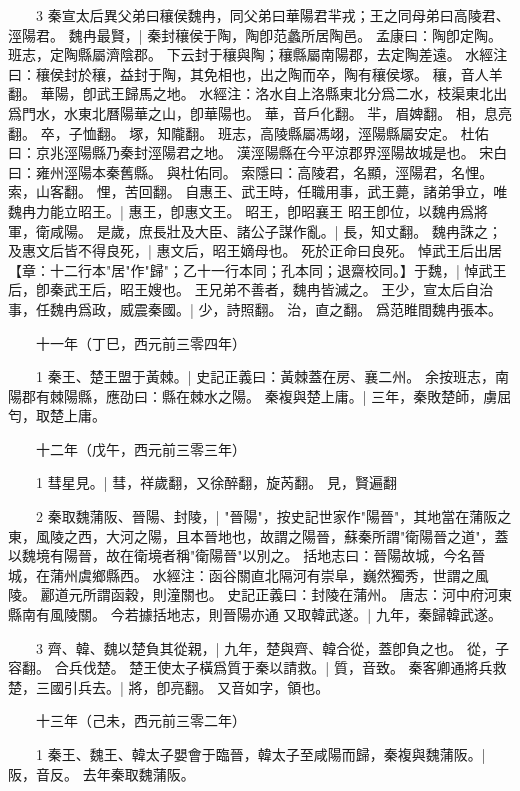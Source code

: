 　　3 秦宣太后異父弟曰穰侯魏冉，同父弟曰華陽君羋戎；王之同母弟曰高陵君、涇陽君。
	魏冉最賢，|{
	秦封穰侯于陶，陶卽范蠡所居陶邑。
	孟康曰：陶卽定陶。
	班志，定陶縣屬濟陰郡。
	下云封于穰與陶；穰縣屬南陽郡，去定陶差遠。
	水經注曰：穰侯封於穰，益封于陶，其免相也，出之陶而卒，陶有穰侯塚。
	穰，音人羊翻。
	華陽，卽武王歸馬之地。
	水經注：洛水自上洛縣東北分爲二水，枝渠東北出爲門水，水東北曆陽華之山，卽華陽也。
	華，音戶化翻。
	羋，眉婢翻。
	相，息亮翻。
	卒，子恤翻。
	塚，知隴翻。
	班志，高陵縣屬馮翊，涇陽縣屬安定。
	杜佑曰：京兆涇陽縣乃秦封涇陽君之地。
	漢涇陽縣在今平涼郡界涇陽故城是也。
	宋白曰：雍州涇陽本秦舊縣。
	與杜佑同。
	索隱曰：高陵君，名顯，涇陽君，名悝。
	索，山客翻。
	悝，苦回翻。
}
自惠王、武王時，任職用事，武王薨，諸弟爭立，唯魏冉力能立昭王。|{
	惠王，卽惠文王。
	昭王，卽昭襄王
	}
昭王卽位，以魏冉爲將軍，衛咸陽。
	是歲，庶長壯及大臣、諸公子謀作亂。|{
	長，知丈翻。
}
魏冉誅之；及惠文后皆不得良死，|{
	惠文后，昭王嫡母也。
	死於正命曰良死。
}
悼武王后出居【章：十二行本"居"作"歸"；乙十一行本同；孔本同；退齋校同。】于魏，|{
	悼武王后，卽秦武王后，昭王嫂也。
}
王兄弟不善者，魏冉皆滅之。
	王少，宣太后自治事，任魏冉爲政，威震秦國。|{
	少，詩照翻。
	治，直之翻。
	爲范睢間魏冉張本。
}

　　十一年（丁巳，西元前三零四年）

　　1 秦王、楚王盟于黃棘。|{
	史記正義曰：黃棘蓋在房、襄二州。
	余按班志，南陽郡有棘陽縣，應劭曰：縣在棘水之陽。
}
秦複與楚上庸。|{
	三年，秦敗楚師，虜屈匄，取楚上庸。
}

　　十二年（戊午，西元前三零三年）

　　1 彗星見。|{
	彗，祥歲翻，又徐醉翻，旋芮翻。
	見，賢遍翻
	}

　　2 秦取魏蒲阪、晉陽、封陵，|{
	"晉陽"，按史記世家作"陽晉"，其地當在蒲阪之東，風陵之西，大河之陽，且本晉地也，故謂之陽晉，蘇秦所謂"衛陽晉之道"，蓋以魏境有陽晉，故在衛境者稱"衛陽晉"以別之。
	括地志曰：晉陽故城，今名晉城，在蒲州虞鄉縣西。
	水經注：函谷關直北隔河有崇阜，巍然獨秀，世謂之風陵。
	酈道元所謂函穀，則潼關也。
	史記正義曰：封陵在蒲州。
	唐志：河中府河東縣南有風陵關。
	今若據括地志，則晉陽亦通
	}
又取韓武遂。|{
	九年，秦歸韓武遂。
}

　　3 齊、韓、魏以楚負其從親，|{
	九年，楚與齊、韓合從，蓋卽負之也。
	從，子容翻。
}
合兵伐楚。
	楚王使太子橫爲質于秦以請救。|{
	質，音致。
}
秦客卿通將兵救楚，三國引兵去。|{
	將，卽亮翻。
	又音如字，領也。
}

　　十三年（己未，西元前三零二年）

　　1 秦王、魏王、韓太子嬰會于臨晉，韓太子至咸陽而歸，秦複與魏蒲阪。|{
	阪，音反。
	去年秦取魏蒲阪。
}

